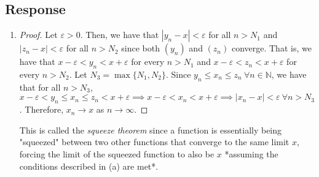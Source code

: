 \documentclass[13pt]{article}
\begin{document}
\subsection*{Response}
\begin{enumerate}[label=(\alph*)]
\item
  \begin{proof}
    Let $\varepsilon > 0$. Then, we have that $|y_n - x| <
    \varepsilon$ for all $n > N_1$ and $|z_n - x| < \varepsilon$ for
    all $n > N_2$ since both $(y_n)$ and $(z_n)$ converge. That is, we
    have that $x - \varepsilon < y_n < x + \varepsilon$ for every $n >
    N_1$ and $x - \varepsilon < z_n < x + \varepsilon$ for every $n >
    N_2$. Let $N_3 = \max{\{N_1, N_2\}}$. Since $y_n \leq x_n \leq z_n
    \ \forall n \in \mathbb{N}$, we have that for all $n > N_3$, $x -
    \varepsilon < y_n \leq x_n \leq z_n < x + \varepsilon \implies x -
    \varepsilon < x_n < x + \varepsilon \implies |x_n - x| <
    \varepsilon \ \forall n > N_3$. Therefore, $x_n \rightarrow x$ as
    $n \rightarrow \infty$.
  \end{proof}
  This is called the \textit{squeeze theorem} since a function is
  essentially being "squeezed" between two other functions that
  converge to the same limit $x$, forcing the limit of the squeezed
  function to also be $x$ *assuming the conditions described in (a)
  are met*.


\end{enumerate}
\end{document}
